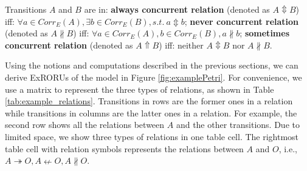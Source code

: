 \documentclass[dvips,...]{llncs}
\begin{document}
\begin{definition}\label{def:concurrentRelations}
Transitions $A$ and $B$ are in: \textbf{always concurrent relation} (denoted as $A\Updownarrow B$) iff: $\forall a\in Corr_{E}(A),\exists b\in Corr_{E}(B),s.t.~a\Updownarrow b$; \textbf{never concurrent relation} (denoted as $A\nparallel B$) iff: $\forall a\in Corr_{E}(A),b\in Corr_{E}(B),a\nparallel b$; \textbf{sometimes concurrent relation} (denoted as $A\Uparrow B$) iff: neither $A\Updownarrow B$ nor $A\nparallel B$.
\end{definition}

Using the notions and computations described in the previous sections, we can derive ExRORUs of the model in Figure \ref{fig:examplePetri}. For convenience, we use a matrix to represent the three types of relations, as shown in Table \ref{tab:example_relations}. Transitions in rows are the former ones in a relation while transitions in columns are the latter ones in a relation. For example, the second row shows all the relations between $A$ and the other transitions. Due to limited space, we show three types of relations in one table cell. The rightmost table cell with relation symbols represents the relations between $A$ and $O$, i.e., $A\twoheadrightarrow O,A\nleftarrow O,A\nparallel O$.
\end{document}
